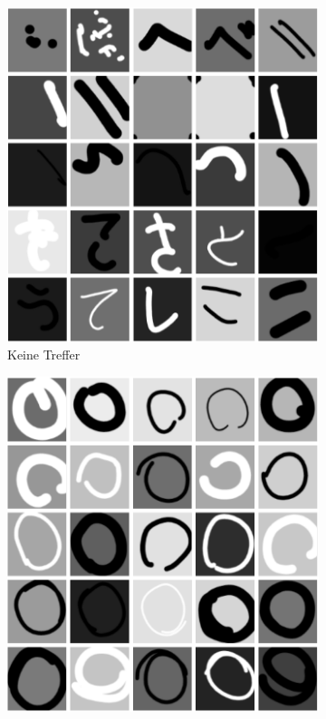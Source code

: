 \begin{figure}
    \centering
    \begin{subfigure}[b]{0.3\textwidth}
        \includegraphics[width=\textwidth]{images/25_n.png}
        \caption{Keine Treffer}
        \label{fig:25_non_hits}
    \end{subfigure}
    \begin{subfigure}[b]{0.3\textwidth}
        \includegraphics[width=\textwidth]{images/25_o.png}

\end{subfigure}
\end{figure}
